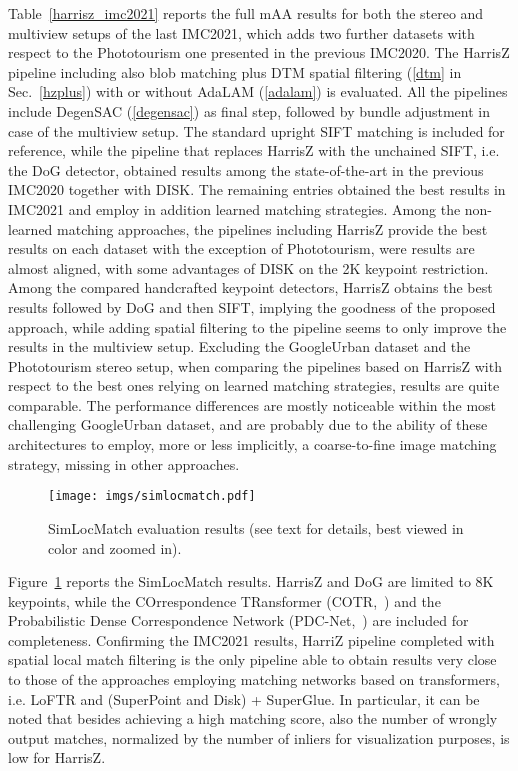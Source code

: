 \documentclass[times,twocolumn,final,authoryear]{elsarticle}
\begin{document}
Table~\ref{harrisz_imc2021} reports the full mAA results for both the stereo and multiview setups of the last IMC2021, which adds two further datasets with respect to the Phototourism one presented in the previous IMC2020. The HarrisZ pipeline including also blob matching plus DTM spatial filtering (\ref{dtm} in Sec.~\ref{hzplus}) with or without AdaLAM (\ref{adalam}) is evaluated. All the pipelines include DegenSAC (\ref{degensac}) as final step, followed by bundle adjustment in case of the multiview setup. The standard upright SIFT matching is included for reference, while the pipeline that replaces HarrisZ with the unchained SIFT, i.e. the DoG detector, obtained results among the state-of-the-art in the previous IMC2020 together with DISK. The remaining entries obtained the best results in IMC2021 and employ in addition learned matching strategies. Among the non-learned matching approaches, the pipelines including HarrisZ provide the best results on each dataset with the exception of Phototourism, were results are almost aligned, with some advantages of DISK on the 2K keypoint restriction. Among the compared handcrafted keypoint detectors, HarrisZ obtains the best results followed by DoG and then SIFT, implying the goodness of the proposed approach, while adding spatial filtering to the pipeline seems to only improve the results in the multiview setup. Excluding the GoogleUrban dataset and the Phototourism stereo setup, when comparing the pipelines based on HarrisZ with respect to the best ones relying on learned matching strategies, results are quite comparable. The performance differences are mostly noticeable within the most challenging GoogleUrban dataset, and are probably due to the ability of these architectures to employ, more or less implicitly, a coarse-to-fine image matching strategy, missing in other approaches.

\begin{figure}[ht]
	\center
	\vspace{-2em}
	\texttt{[image: imgs/simlocmatch.pdf]}
	\caption{\label{simlocmatch}
		SimLocMatch evaluation results (see text for details, best viewed in color and zoomed in).}
\end{figure}
Figure~\ref{simlocmatch} reports the SimLocMatch results. HarrisZ and DoG are limited to 8K keypoints, while the COrrespondence TRansformer (COTR,~\cite{cotr}) and the Probabilistic Dense Correspondence Network (PDC-Net,~\cite{dense}) are included for completeness. Confirming the IMC2021 results, HarriZ pipeline completed with spatial local match filtering is the only pipeline able to obtain results very close to those of the approaches employing matching networks based on transformers, i.e. LoFTR and (SuperPoint and Disk) + SuperGlue. In particular, it can be noted that besides achieving a high matching score, also the number of wrongly output matches, normalized by the number of inliers for visualization purposes, is low for HarrisZ.
\end{document}
